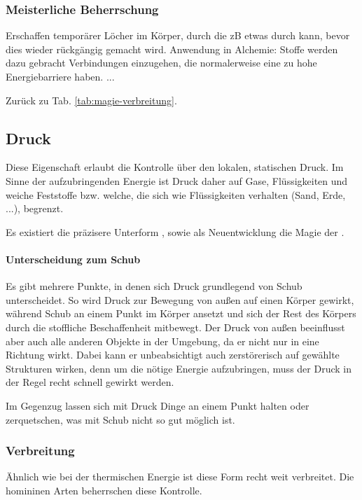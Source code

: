 \subsubsection{Meisterliche Beherrschung} 
\begin{outline}
	\1 Erschaffen temporärer Löcher im Körper, durch die zB etwas durch kann, bevor dies wieder rückgängig gemacht wird.
	\1 Anwendung in Alchemie: Stoffe werden dazu gebracht Verbindungen einzugehen, die normalerweise eine zu hohe Energiebarriere haben.
	\1 ...
\end{outline}
Zurück zu Tab. \ref{tab:magie-verbreitung}.



\subsection{Druck}\label{magie:druck}
Diese Eigenschaft erlaubt die Kontrolle über den lokalen, statischen Druck. 
Im Sinne der aufzubringenden Energie ist Druck daher auf Gase, Flüssigkeiten und weiche Feststoffe bzw. welche, die sich wie Flüssigkeiten verhalten (Sand, Erde, ...), begrenzt.

Es existiert die präzisere Unterform , sowie als Neuentwicklung die Magie der .

\paragraph{Unterscheidung zum Schub}
Es gibt mehrere Punkte, in denen sich Druck grundlegend von Schub unterscheidet.
So wird Druck zur Bewegung von außen auf einen Körper gewirkt, während Schub an einem Punkt im Körper ansetzt und sich der Rest des Körpers durch die stoffliche Beschaffenheit mitbewegt.
Der Druck von außen beeinflusst aber auch alle anderen Objekte in der Umgebung, da er nicht nur in eine Richtung wirkt.
Dabei kann er unbeabsichtigt auch zerstörerisch auf gewählte Strukturen wirken, denn um die nötige Energie aufzubringen, muss der Druck in der Regel recht schnell gewirkt werden.

Im Gegenzug lassen sich mit Druck Dinge an einem Punkt halten oder zerquetschen, was mit Schub nicht so gut möglich ist.

\subsubsection{Verbreitung}
Ähnlich wie bei der thermischen Energie ist diese Form recht weit verbreitet. 
Die homininen Arten beherrschen diese Kontrolle. 

